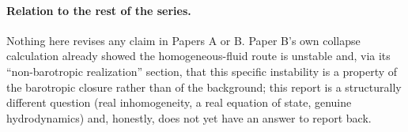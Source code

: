 \documentclass[11pt]{article}
\begin{document}
\paragraph{Relation to the rest of the series.} Nothing here revises any claim in Papers A or B. Paper B's own collapse calculation already showed the homogeneous-fluid route is unstable and, via its ``non-barotropic realization'' section, that this specific instability is a property of the barotropic closure rather than of the background; this report is a structurally different question (real inhomogeneity, a real equation of state, genuine hydrodynamics) and, honestly, does not yet have an answer to report back.



\end{document}
